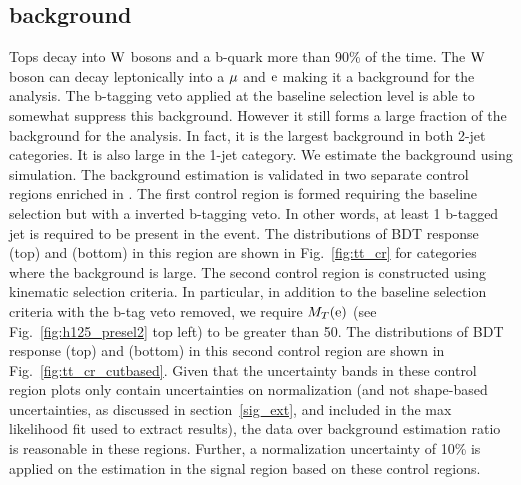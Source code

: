 \subsection{\ttb background}
\label{h125_ttb}
Tops decay into $\text{W}$ bosons and a b-quark more than 90\% of the time. The $\text{W}$ boson can decay leptonically into a $\mu$ and $\text{e}$ making it a background for the analysis. The b-tagging veto applied at the baseline selection level is able to somewhat suppress this background. However it still forms a large fraction of the background for the analysis. In fact, it is the largest background in both 2-jet categories. It is also large in the 1-jet category. We estimate the \ttb background using simulation. The background estimation is validated in two separate control regions enriched in \ttb. The first control region is formed requiring the baseline selection but with a inverted b-tagging veto. In other words, at least 1 b-tagged jet is required to be present in the event. The distributions of BDT response (top) and \mcol (bottom) in this region are shown in Fig.~\ref{fig:tt_cr} for categories where the \ttb background is large. The second control region is constructed using kinematic selection criteria. In particular, in addition to the baseline selection criteria with the b-tag veto removed, we require $M_T(\text{e})$ (see Fig.~\ref{fig:h125_presel2} top left) to be greater than 50\GeV. The distributions of BDT response (top) and \mcol (bottom) in this second control region are shown in Fig.~\ref{fig:tt_cr_cutbased}. Given that the uncertainty bands in these control region plots only contain uncertainties on normalization (and not shape-based uncertainties, as discussed in section~\ref{sig_ext}, and included in the max likelihood fit used to extract results), the data over background estimation  ratio is reasonable in these regions. Further, a normalization uncertainty of 10\% is applied on the \ttb estimation in the signal region based on these control regions.


